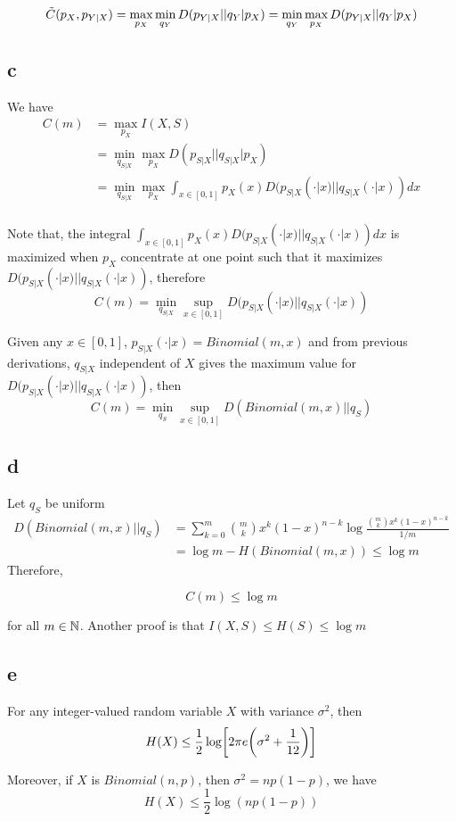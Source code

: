 \documentclass{article}
\begin{document}
$$
    \Tilde{C}(p_X, p_{Y|X}) = \max_{p_X} \min_{q_Y} D(p_{Y|X} || q_Y | p_X) =  \min_{q_Y} \max_{p_X} D(p_{Y|X} || q_Y | p_X)
$$

\subsection{c}

We have
\begin{align*}
    C(m)
    &= \max_{p_X} I(X, S) \\
    &= \min_{q_{S|X}} \max_{p_X} D(p_{S|X} || q_{S|X} | p_X) \\
    &= \min_{q_{S|X}} \max_{p_X} \int_{x \in [0, 1]} p_X(x) D(p_{S|X}(\cdot | x) || q_{S|X}(\cdot | x)) dx\\
\end{align*}

Note that, the integral $\int_{x \in [0, 1]} p_X(x) D(p_{S|X}(\cdot | x) || q_{S|X}(\cdot | x)) dx$ is maximized when $p_X$ concentrate at one point such that it maximizes $D(p_{S|X}(\cdot | x) || q_{S|X}(\cdot | x))$, therefore
$$
    C(m) = \min_{q_{S|X}} \sup_{x \in [0, 1]} D(p_{S|X}(\cdot | x) || q_{S|X}(\cdot | x))
$$

Given any $x \in [0, 1]$, $p_{S|X}(\cdot | x) = Binomial(m, x)$ and from previous derivations, $q_{S|X}$ independent of $X$ gives the maximum value for $D(p_{S|X}(\cdot | x) || q_{S|X}(\cdot | x))$, then
$$
    C(m) = \min_{q_S} \sup_{x \in [0, 1]} D(Binomial(m, x) || q_S)
$$

\subsection{d}

Let $q_S$ be uniform
\begin{align*}
    D(Binomial(m, x) || q_S)
    &= \sum_{k=0}^m {m \choose k} x^k (1-x)^{n-k} \log \frac{{m \choose k} x^k (1-x)^{n-k}}{1/m} \\
    &= \log m - H(Binomial(m, x)) \leq \log m
\end{align*}
Therefore, 

$$
    C(m) \leq \log m 
$$

for all $m \in \mathbb{N}$. Another proof is that $I(X, S) \leq H(S) \leq \log m$

\subsection{e}
\begin{lemma}
    For any integer-valued random variable $X$ with variance $\sigma^2$, then
    $$
        H(X) \leq \frac{1}{2} \log \bracket*{2 \pi e \tuple*{\sigma^2 + \frac{1}{12}}}
    $$

    Moreover, if $X$ is $Binomial(n, p)$, then $\sigma^2 = np(1-p)$, we have
    $$
        H(X) \leq \frac{1}{2} \log(np(1-p))
    $$
    
\end{lemma}
\end{document}
